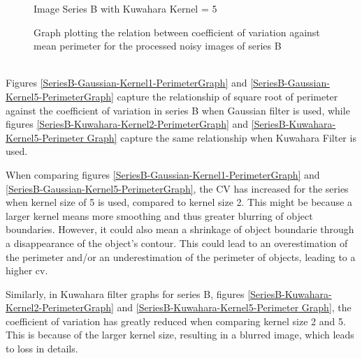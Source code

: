 \documentclass[runningheads]{llncs}
\begin{document}
\begin{figure}[h!]
\begin{minipage}[h]{0.47\linewidth}
\begin{center}
\caption{Image Series B with Kuwahara Kernel = 5}
\label{SeriesB-Kuwahara-Kernel5-Perimeter Graph}
\end{center}
\end{minipage}
\caption*{ Graph plotting the relation between coefficient of variation against mean perimeter for the processed noisy images of series B}
\label{SeriesB-Gaussian/Kuwahara-PerimeterGraph}
\end{figure}

~\\ Figures \ref{SeriesB-Gaussian-Kernel1-PerimeterGraph} and \ref{SeriesB-Gaussian-Kernel5-PerimeterGraph} capture the relationship of square root of perimeter against the coefficient of variation in series B when Gaussian filter is used, while figures \ref{SeriesB-Kuwahara-Kernel2-PerimeterGraph} and \ref{SeriesB-Kuwahara-Kernel5-Perimeter Graph} capture the same relationship when Kuwahara Filter is used. 
\par When comparing figures \ref{SeriesB-Gaussian-Kernel1-PerimeterGraph} and \ref{SeriesB-Gaussian-Kernel5-PerimeterGraph}, the CV has increased for the series when kernel size of 5 is used, compared to kernel size 2. This might be because a larger kernel means more smoothing and thus greater blurring of object boundaries. However, it could also mean a shrinkage of object boundarie through a disappearance of the object's contour. This could lead to an overestimation of the perimeter and/or an underestimation of the perimeter of objects, leading to a higher cv. 
\par Similarly, in Kuwahara filter graphs for series B, figures \ref{SeriesB-Kuwahara-Kernel2-PerimeterGraph} and \ref{SeriesB-Kuwahara-Kernel5-Perimeter Graph}, the coefficient of variation has greatly reduced when comparing kernel size 2 and 5.  This is because of the larger kernel size, resulting in a blurred image, which leads to loss in details. 
\newpage
\end{document}
